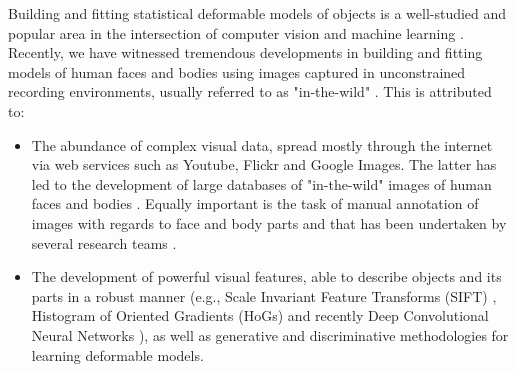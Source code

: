 Building and fitting statistical deformable models of objects is a well-studied and popular area in the intersection of computer vision and machine learning \cite{Cootes1995, Cootes2001, Matthews2004, Saragih2011, Belhumeur2011, Zhu2012, Xiong2013}. Recently, we have witnessed tremendous developments in building and fitting models of human faces and bodies using images captured in unconstrained recording environments, usually referred to as "in-the-wild" \cite{Belhumeur2011, Cao2012, Zhu2012, Xiong2013, Asthana2013, Tzimiropoulos2014, Asthana2014}. This is attributed to:
\begin{itemize}

\item The abundance of complex visual data, spread mostly through the internet via web services such as Youtube, Flickr and Google Images. The latter has led to the development of large databases of "in-the-wild" images of human faces and bodies \cite{Belhumeur2011, Le2012, Zhu2012, Burgos2013}. Equally important is the task of manual annotation of images with regards to face and body parts and that has been undertaken by several research teams \cite{sagonas_iccv_300w_2013}.

\item The development of powerful visual features, able to describe objects and its parts in a robust manner (e.g., Scale Invariant Feature Transforms (SIFT) \cite{lowe1999object}, Histogram of Oriented Gradients (HoGs) \cite{Dalal2005} and recently Deep Convolutional Neural Networks \cite{sermanet2013overfeat}), as well as generative and discriminative methodologies for learning deformable models.

\end{itemize}

